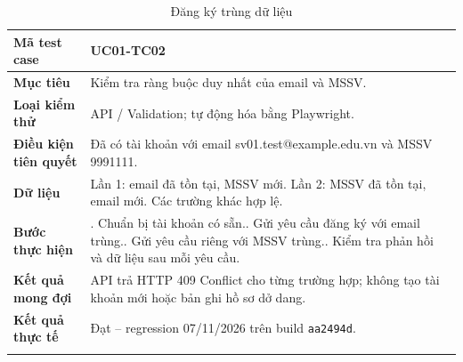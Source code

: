 \begin{table}[H]
\centering
\begingroup\small
\renewcommand{\arraystretch}{1.18}
\caption{Đăng ký trùng dữ liệu}\label{tab:i1-detail-2}
\begin{tabularx}{\linewidth}{@{}p{.23\linewidth}>{\raggedright\arraybackslash}X@{}}
\toprule
\textbf{Mã test case} & \textbf{UC01-TC02} \\\midrule
\textbf{Mục tiêu} & Kiểm tra ràng buộc duy nhất của email và MSSV. \\ \addlinespace[3pt]
\textbf{Loại kiểm thử} & API / Validation; tự động hóa bằng Playwright. \\ \addlinespace[3pt]
\textbf{Điều kiện tiên quyết} & Đã có tài khoản với email sv01.test@example.edu.vn và MSSV 9991111. \\ \addlinespace[3pt]
\textbf{Dữ liệu} & Lần 1: email đã tồn tại, MSSV mới. Lần 2: MSSV đã tồn tại, email mới. Các trường khác hợp lệ. \\ \addlinespace[3pt]
\textbf{Bước thực hiện} & 1. Chuẩn bị tài khoản có sẵn.\newline 2. Gửi yêu cầu đăng ký với email trùng.\newline 3. Gửi yêu cầu riêng với MSSV trùng.\newline 4. Kiểm tra phản hồi và dữ liệu sau mỗi yêu cầu. \\ \addlinespace[3pt]
\textbf{Kết quả mong đợi} & API trả HTTP 409 Conflict cho từng trường hợp; không tạo tài khoản mới hoặc bản ghi hồ sơ dở dang. \\ \addlinespace[3pt]
\textbf{Kết quả thực tế} & Đạt -- regression 07/11/2026 trên build \texttt{aa2494d}.\\ \addlinespace[3pt]
\bottomrule
\end{tabularx}
\endgroup
\end{table}

